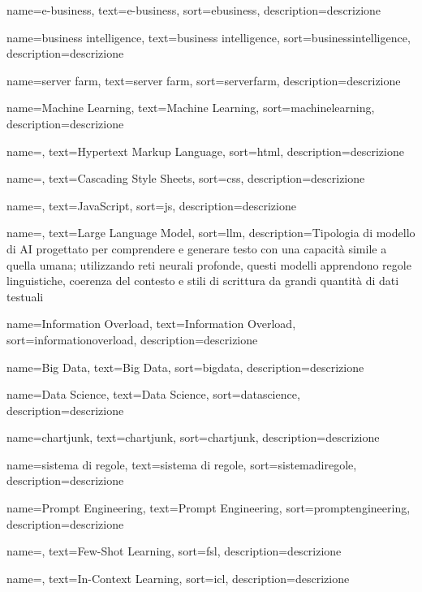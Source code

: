  {
    name=e-business,
    text=e-business,
    sort=ebusiness,
    description={descrizione}
}

 {
    name=business intelligence,
    text=business intelligence,
    sort=businessintelligence,
    description={descrizione}
}

 {
    name=server farm,
    text=server farm,
    sort=serverfarm,
    description={descrizione}
}

 {
    name=Machine Learning,
    text=Machine Learning,
    sort=machinelearning,
    description={descrizione}
}

 {
    name=,
    text=Hypertext Markup Language,
    sort=html,
    description={descrizione}
}

 {
    name=,
    text=Cascading Style Sheets,
    sort=css,
    description={descrizione}
}

 {
    name=,
    text=JavaScript,
    sort=js,
    description={descrizione}
}

 {
    name=,
    text=Large Language Model,
    sort=llm,
    description={Tipologia di modello di AI progettato per comprendere e
    generare testo con una capacità simile a quella umana; utilizzando reti neurali
    profonde, questi modelli apprendono regole linguistiche, coerenza del contesto e
    stili di scrittura da grandi quantità di dati testuali}
}

 {
    name=Information Overload,
    text=Information Overload,
    sort=informationoverload,
    description={descrizione}
}

 {
    name=Big Data,
    text=Big Data,
    sort=bigdata,
    description={descrizione}
}

 {
    name=Data Science,
    text=Data Science,
    sort=datascience,
    description={descrizione}
}

 {
    name=chartjunk,
    text=chartjunk,
    sort=chartjunk,
    description={descrizione}
}

 {
    name=sistema di regole,
    text=sistema di regole,
    sort=sistemadiregole,
    description={descrizione}
}

 {
    name=Prompt Engineering,
    text=Prompt Engineering,
    sort=promptengineering,
    description={descrizione}
}

 {
    name=,
    text=Few-Shot Learning,
    sort=fsl,
    description={descrizione}
}

 {
    name=,
    text=In-Context Learning,
    sort=icl,
    description={descrizione}
}
